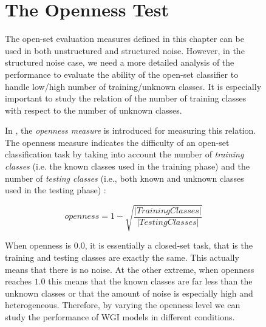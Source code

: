 \begin{figure}[p]




\section{The Openness Test}\label{chap:eval_methods:sec:openness}

The open-set evaluation measures defined in this chapter can be used in both unstructured and structured noise. However, in the structured noise case, we need a more detailed analysis of the performance to evaluate the ability of the open-set classifier to handle low/high number of training/unknown classes. It is especially important to study the relation of the number of training classes with respect to the number of unknown classes. 

In \parencite{scheirer2013toward}, the \textit{openness measure} is introduced for measuring this relation. The openness measure indicates the difficulty of an open-set classification task by taking into account the number of \textit{training classes} (i.e. the known classes used in the training phase) and the number of \textit{testing classes} (i.e., both known and unknown classes used in the testing phase) :

\begin{equation}\label{chap:eval_methods:eq:openness}
	openness=1-\sqrt{\frac{ | Training Classes | }{ |Testing Classes | }}
\end{equation}

When openness is $0.0$, it is essentially a closed-set task, that is the training and testing classes are exactly the same. This actually means that there is no noise. At the other extreme, when openness reaches $1.0$ this means that the known classes are far less than the unknown classes or that the amount of noise is especially high and heterogeneous. Therefore, by varying the openness level we can study the performance of WGI models in different conditions.


\end{figure}
